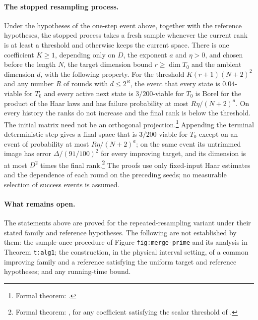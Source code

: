 \documentclass{article}
\begin{document}
\paragraph{The stopped resampling process.}
Under the hypotheses of the one-step event above, together with the
reference hypotheses, the stopped process takes a fresh sample whenever the
current rank is at least a threshold and otherwise keeps the current space.
There is one coefficient $K\ge1$, depending only on $D$, the exponent $a$
and $\eta>0$, and chosen before the length $N$, the target dimension bound
$r\ge\dim T_0$ and the ambient dimension $d$, with the following property.
For the threshold $K(r+1)(N+2)^2$ and any number $R$ of rounds with
$d\le2^R$, the event that every state is $0.04$-viable for $T_0$ and every
active next state is $3/200$-viable for $T_0$ is Borel for the product of
the Haar laws and has failure probability at most $R\eta/(N+2)^a$. On every
history the ranks do not increase and the final rank is below the
threshold. The initial matrix need not be an orthogonal
projection.\footnote{Formal theorem:
.}
Appending the terminal deterministic step gives a final space that is
$3/200$-viable for $T_0$ except on an event of probability at most
$R\eta/(N+2)^a$; on the same event its untrimmed image has error
$\Delta/(91/100)^2$ for every improving target, and its dimension is at most
$D^2$ times the final rank.\footnote{Formal theorem:
,
for any coefficient satisfying the scalar threshold of
.}
The proofs use only fixed-input Haar estimates and the dependence of each
round on the preceding seeds; no measurable selection of success events is
assumed.

\paragraph{What remains open.}
The statements above are proved for the repeated-resampling variant under
their stated family and reference hypotheses. The following are not
established by them: the sample-once procedure of Figure
\texttt{fig:merge-prime} and its analysis in Theorem \texttt{t:alg1}; the
construction, in the physical interval setting, of a common improving
family and a reference satisfying the uniform target and reference
hypotheses; and any running-time bound.
\end{document}
